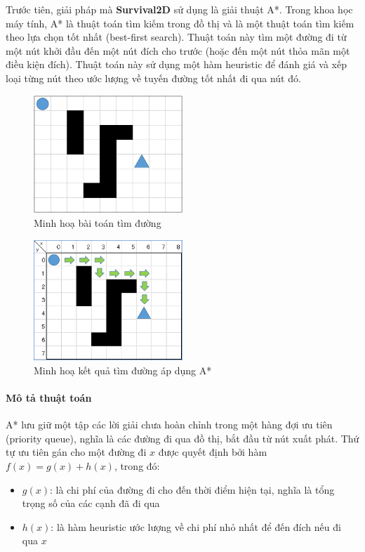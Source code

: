 \documentclass[12pt,a4paper]{article}
\begin{document}
  Trước tiên, giải pháp mà \textbf{Survival2D} sử dụng là giải thuật A*. Trong khoa học máy tính, A* là thuật toán tìm kiếm trong đồ thị và là một thuật toán tìm kiếm theo lựa chọn tốt nhất (best-first search). Thuật toán này tìm một đường đi từ một nút khởi đầu đến một nút đích cho trước (hoặc đến một nút thỏa mãn một điều kiện đích). Thuật toán này sử dụng một hàm heuristic để đánh giá và xếp loại từng nút theo ước lượng về tuyến đường tốt nhất đi qua nút đó.
  \begin{figure}[H]
      \centering
      \includegraphics[width=0.5\textwidth]{Img/AI/A_Star_image1.png}
      \caption{Minh hoạ bài toán tìm đường\cite{a_star}}
  \end{figure}
  \begin{figure}[H]
      \centering
      \includegraphics[width=0.5\textwidth]{Img/AI/A_Star_image2.png}
      \caption{Minh hoạ kết quả tìm đường áp dụng A*\cite{a_star}}
  \end{figure}

  \paragraph{Mô tả thuật toán}\mbox{}

  A* lưu giữ một tập các lời giải chưa hoàn chỉnh trong một hàng đợi ưu tiên (priority queue), nghĩa là các đường đi qua đồ thị, bắt đầu từ nút xuất phát. Thứ tự ưu tiên gán cho một đường đi \(x\) được quyết định bởi hàm
  \(f(x) = g(x) + h(x)\), trong đó:
  \begin{itemize}
      \item \(g(x)\): là chi phí của đường đi cho đến thời điểm hiện tại, nghĩa là tổng trọng số của các cạnh đã đi qua
      \item \(h(x)\): là hàm heuristic ước lượng về chi phí nhỏ nhất để đến đích nếu đi qua \(x\)
  \end{itemize}
  
\end{document}
